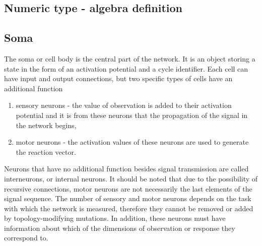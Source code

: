 \FloatBarrier
\subsection{Numeric type - algebra definition}



\FloatBarrier
\subsection{Soma}
The soma or cell body is the central part of the network. 
It is an object storing a state in the form of an activation potential and a cycle identifier. 
Each cell can have input and output connections, but two specific types of cells have an additional 
function
\begin{enumerate}
	\item sensory neurons - the value of observation is added to their activation potential and 
	it is from these neurons that the propagation of the signal in the network begins, 
	\item motor neurons - the activation values of these neurons are used to generate the 
	reaction vector.
\end{enumerate}
Neurons that have no additional function besides signal transmission are called interneurons, 
or internal neurons. 
It should be noted that due to the possibility of recursive connections, motor neurons are not 
necessarily the last elements of the signal sequence. 
The number of sensory and motor neurons depends on the task with which the network is measured, 
therefore they cannot be removed or added by topology-modifying mutations. 
In addition, these neurons must have information about which of the dimensions of observation or 
response they correspond to.
